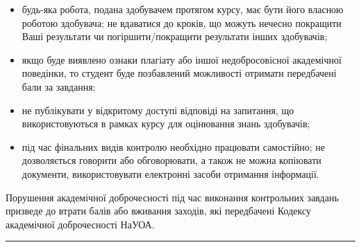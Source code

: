 \documentclass[
  letterpaper,
  DIV=11,
  numbers=noendperiod]{scrreprt}
\begin{document}
\begin{itemize}
\item
  будь-яка робота, подана здобувачем протягом курсу, має бути його
  власною роботою здобувача; не вдаватися до кроків, що можуть нечесно
  покращити Ваші результати чи погіршити/покращити результати інших
  здобувачів;
\item
  якщо буде виявлено ознаки плагіату або іншої недобросовісної
  академічної поведінки, то студент буде позбавлений можливості отримати
  передбачені бали за завдання;
\item
  не публікувати у відкритому доступі відповіді на запитання, що
  використовуються в рамках курсу для оцінювання знань здобувачів;
\item
  під час фінальних видів контролю необхідно працювати самостійно; не
  дозволяється говорити або обговорювати, а також не можна копіювати
  документи, використовувати електронні засоби отримання інформації.
\end{itemize}

Порушення академічної доброчесності під час виконання контрольних
завдань призведе до втрати балів або вживання заходів, які передбачені
Кодексу академічної доброчесності НаУОА.

\begin{center}\rule{0.5\linewidth}{0.5pt}\end{center}
\end{document}
